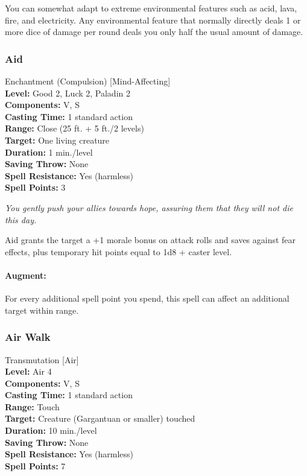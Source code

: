 You can somewhat adapt to extreme environmental features such as acid, lava, fire, and electricity. 
Any environmental feature that normally directly deals 1 or more dice of damage per round deals you only half the usual amount of damage.

\subsubsection{Aid}
\label{Spell:Aid}
Enchantment (Compulsion) [Mind-Affecting]
\\ \textbf{Level:} Good 2, Luck 2, Paladin 2
\\ \textbf{Components:} V, S
\\ \textbf{Casting Time:} 1 standard action
\\ \textbf{Range:} Close (25 ft. + 5 ft./2 levels)
\\ \textbf{Target:} One living creature
\\ \textbf{Duration:} 1 min./level
\\ \textbf{Saving Throw:} None
\\ \textbf{Spell Resistance:} Yes (harmless)
\\ \textbf{Spell Points:} 3

\emph{You gently push your allies towards hope, assuring them that they will not die this day.}

Aid grants the target a +1 morale bonus on attack rolls and saves against fear effects, plus temporary hit points equal to 1d8 + caster level.

\paragraph{Augment:} For every additional spell point you spend, this spell can affect an additional target within range.
\subsubsection{Air Walk}
\label{Spell:AirWalk}
Transmutation [Air]
\\ \textbf{Level:} Air 4
\\ \textbf{Components:} V, S
\\ \textbf{Casting Time:} 1 standard action
\\ \textbf{Range:} Touch
\\ \textbf{Target:} Creature (Gargantuan or smaller) touched
\\ \textbf{Duration:} 10 min./level
\\ \textbf{Saving Throw:} None
\\ \textbf{Spell Resistance:} Yes (harmless)
\\ \textbf{Spell Points:} 7

